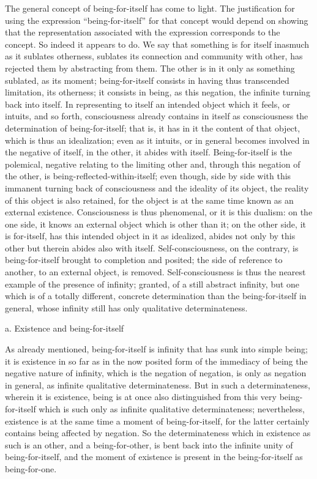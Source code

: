 The general concept of being-for-itself has come to light.
The justification for using the expression “being-for-itself”
for that concept would depend on showing that the representation
associated with the expression corresponds to the concept.
So indeed it appears to do.
We say that something is for itself
inasmuch as it sublates otherness,
sublates its connection and community with other,
has rejected them by abstracting from them.
The other is in it only as something sublated, as its moment;
being-for-itself consists in
having thus transcended limitation, its otherness;
it consists in being, as this negation,
the infinite turning back into itself.
In representing to itself an intended object
which it feels, or intuits, and so forth,
consciousness already contains in itself as consciousness
the determination of being-for-itself;
that is, it has in it the content of that object,
which is thus an idealization;
even as it intuits, or in general becomes
involved in the negative of itself, in the other,
it abides with itself.
Being-for-itself is the polemical,
negative relating to the limiting other
and, through this negation of the other,
is being-reflected-within-itself;
even though, side by side with this
immanent turning back of consciousness
and the ideality of its object,
the reality of this object is also retained,
for the object is at the same time
known as an external existence.
Consciousness is thus phenomenal,
or it is this dualism:
on the one side, it knows an external object
which is other than it;
on the other side, it is for-itself,
has this intended object in it as idealized,
abides not only by this other
but therein abides also with itself.
Self-consciousness, on the contrary, is
being-for-itself brought to completion and posited;
the side of reference to another,
to an external object, is removed.
Self-consciousness is thus the nearest
example of the presence of infinity;
granted, of a still abstract infinity,
but one which is of a totally different,
concrete determination than the
being-for-itself in general,
whose infinity still has only qualitative determinateness.

a. Existence and being-for-itself

As already mentioned, being-for-itself is
infinity that has sunk into simple being;
it is existence in so far as in the
now posited form of the immediacy
of being the negative nature of infinity,
which is the negation of negation,
is only as negation in general,
as infinite qualitative determinateness.
But in such a determinateness, wherein it is existence,
being is at once also distinguished
from this very being-for-itself
which is such only as infinite
qualitative determinateness;
nevertheless, existence is at the same time
a moment of being-for-itself,
for the latter certainly contains
being affected by negation.
So the determinateness which in existence as such is
an other, and a being-for-other,
is bent back into the infinite unity of being-for-itself,
and the moment of existence is present
in the being-for-itself as being-for-one.

